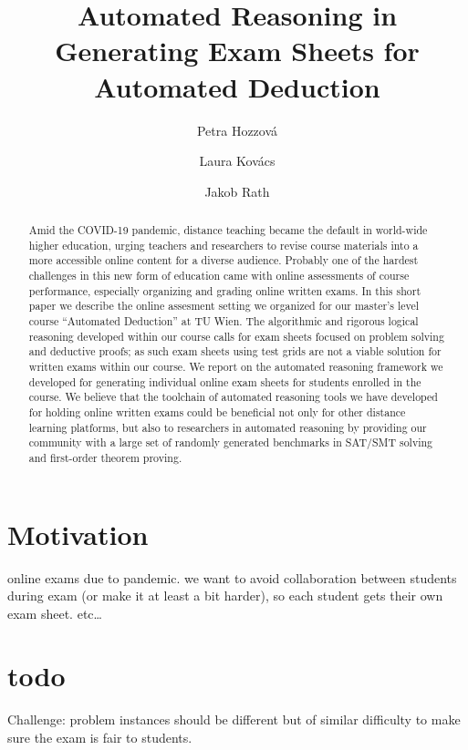 \documentclass[12pt]{llncs}
\title{Automated Reasoning in Generating Exam Sheets for Automated Deduction}
\author{Petra Hozzov\'a\and
Laura Kov\'acs \and
Jakob Rath}
\institute{
    TU Wien, Austria
}
\begin{document}
\maketitle





\begin{abstract}
Amid the COVID-19 pandemic, distance teaching became the default in world-wide higher education,
urging teachers and researchers to revise course materials into a
more accessible online content for a diverse audience. Probably one of the hardest challenges in this new form of education
came with online assessments of course performance, especially organizing and grading online written exams.
In this short paper we describe the online assesment
setting  we organized for our master's level course ``Automated
Deduction'' at TU Wien.
The algorithmic and rigorous logical reasoning developed within our
course calls for exam sheets focused on problem solving and deductive
proofs; as such exam sheets using test grids are not a viable solution
for written exams within our course.
We report on the automated reasoning framework we developed for generating individual online exam sheets for students enrolled in the course.
We believe that the toolchain of automated reasoning tools we have developed for holding online written exams could be beneficial not only for other distance learning platforms, but also to researchers in automated reasoning by providing our community with a large set of randomly generated benchmarks in SAT/SMT solving and first-order theorem proving.
\end{abstract}





\section{Motivation}

online exams due to pandemic.
we want to avoid collaboration between students during exam (or make it at least a bit harder),
so each student gets their own exam sheet.
etc…





\section{todo}

Challenge:
problem instances should be different but of similar difficulty to make sure the exam is fair to students.
\end{document}
